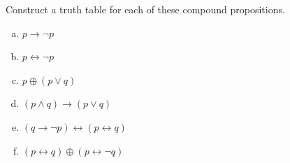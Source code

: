\documentclass[a4paper,12pt,oneside,article]{memoir}
\begin{document}
\begin{tcolorbox}
	[colback=Emerald!10,colframe=cyan!40!black,title=\textbf{Question 34}]
	Construct a truth table for each of these compound propositions.
	\begin{enumerate}[a)]
		\item $p \rightarrow \lnot p $
		\item $p \leftrightarrow \lnot p$
		\item $p \oplus  (p \lor q)$
		\item $(p \land q) \rightarrow (p \lor q)$
		\item $(q \rightarrow \lnot p) \leftrightarrow (p \leftrightarrow q)$
		\item $(p \leftrightarrow q) \oplus (p \leftrightarrow \lnot q)$
	\end{enumerate}
\end{tcolorbox}
\end{document}
